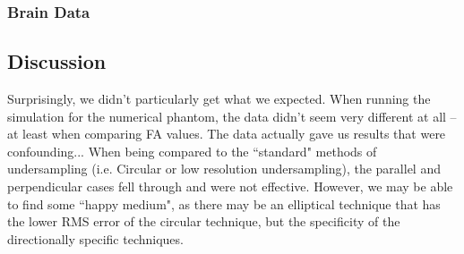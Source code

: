 \documentclass[11 pt]{article}
\begin{document}
    \subsubsection{Brain Data}
    
    
  
  \subsection{Discussion}
  
  Surprisingly, we didn't particularly get what we expected. When running the simulation for the numerical phantom, the data didn't seem very different at all -- at least when comparing FA values. The data actually gave us results that were confounding... When being compared to the ``standard" methods of undersampling (i.e. Circular or low resolution undersampling), the parallel and perpendicular cases fell through and were not effective. However, we may be able to find some ``happy medium", as there may be an elliptical technique that has the lower RMS error of the circular technique, but the specificity of the directionally specific techniques.
  
  
\end{document}
